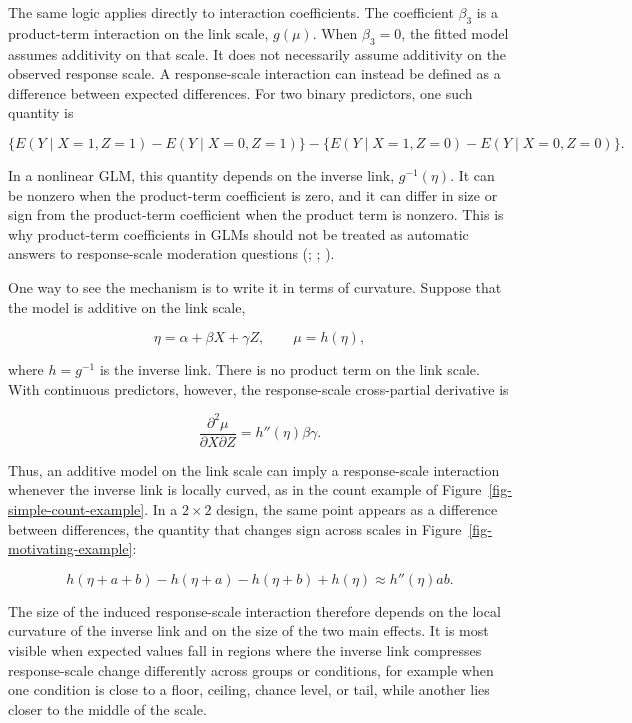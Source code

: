 \documentclass[
  man,
  longtable,
  nolmodern,
  notxfonts,
  notimes,
  colorlinks=true,linkcolor=blue,citecolor=blue,urlcolor=blue]{apa7}
\begin{document}
The same logic applies directly to interaction coefficients. The
coefficient \(\beta_3\) is a product-term interaction on the link scale,
\(g(\mu)\). When \(\beta_3 = 0\), the fitted model assumes additivity on
that scale. It does not necessarily assume additivity on the observed
response scale. A response-scale interaction can instead be defined as a
difference between expected differences. For two binary predictors, one
such quantity is

\[
\{E(Y \mid X = 1, Z = 1) - E(Y \mid X = 0, Z = 1)\}
-
\{E(Y \mid X = 1, Z = 0) - E(Y \mid X = 0, Z = 0)\}.
\]

In a nonlinear GLM, this quantity depends on the inverse link,
\(g^{-1}(\eta)\). It can be nonzero when the product-term coefficient is
zero, and it can differ in size or sign from the product-term
coefficient when the product term is nonzero. This is why product-term
coefficients in GLMs should not be treated as automatic answers to
response-scale moderation questions (; ;
).

One way to see the mechanism is to write it in terms of curvature.
Suppose that the model is additive on the link scale,

\[
\eta = \alpha + \beta X + \gamma Z,
\qquad
\mu = h(\eta),
\]

where \(h = g^{-1}\) is the inverse link. There is no product term on
the link scale. With continuous predictors, however, the response-scale
cross-partial derivative is

\[
\frac{\partial^2 \mu}{\partial X \partial Z}
=
h''(\eta)\beta\gamma.
\]

Thus, an additive model on the link scale can imply a response-scale
interaction whenever the inverse link is locally curved, as in the count
example of Figure~\ref{fig-simple-count-example}. In a \(2 \times 2\)
design, the same point appears as a difference between differences, the
quantity that changes sign across scales in
Figure~\ref{fig-motivating-example}:

\[
h(\eta+a+b)-h(\eta+a)-h(\eta+b)+h(\eta)
\approx
h''(\eta)ab.
\]

The size of the induced response-scale interaction therefore depends on
the local curvature of the inverse link and on the size of the two main
effects. It is most visible when expected values fall in regions where
the inverse link compresses response-scale change differently across
groups or conditions, for example when one condition is close to a
floor, ceiling, chance level, or tail, while another lies closer to the
middle of the scale.
\end{document}
